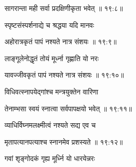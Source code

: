 
{\devanagarifont सागरान्ता मही सर्वा प्रदक्षिणीकृता भवेत् {॥ १९:८॥} \veg\dontdisplaylinenum }%

{\devanagarifont स्पृष्टसंस्पर्शनाद्ये च श्रद्धया यदि मानवः \thinspace{\dandab} \dontdisplaylinenum }%


{\devanagarifont अहोरात्रकृतं पापं नश्यते नात्र संशयः {॥ १९:९॥} \veg\dontdisplaylinenum }%
 
{\devanagarifont लाङ्गूलेनोद्धृतं तोयं मूर्ध्ना गृह्णाति यो नरः \thinspace{\dandab} \dontdisplaylinenum }%


{\devanagarifont यावज्जीवकृतं पापं नश्यते नात्र संशयः {॥ १९:१०॥} \veg\dontdisplaylinenum }%
 
{\devanagarifont विधिवत्स्नापयेद्गांश्च मन्त्रयुक्तेन वारिणा \thinspace{\dandab} \dontdisplaylinenum }%


{\devanagarifont तेनाम्भसा स्वयं स्नात्वा सर्वपापक्षयो भवेत् {॥ १९:११॥} \veg\dontdisplaylinenum }%
 
{\devanagarifont व्याधिर्विघ्नमलक्ष्मीत्वं नश्यते सद्य एव च \thinspace{\dandab} \dontdisplaylinenum }%


{\devanagarifont मृतापत्यानपत्याश्च स्नानमेव प्रशस्यते {॥ १९:१२॥} \veg\dontdisplaylinenum }%

{\devanagarifont गवां शृङ्गोदकं गृह्य मूर्ध्नि यो धारयेन्नरः \thinspace{\dandab} \dontdisplaylinenum }%

